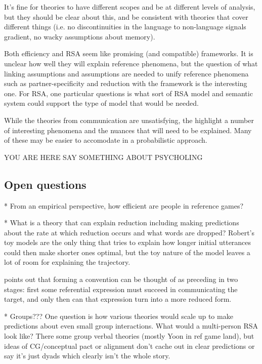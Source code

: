 \documentclass[]{article}
\begin{document}
It's fine for theories to have different scopes and be at different levels of analysis, but they should be clear about this, and be consistent with theories that cover different things (i.e. no discontinuities in the language to non-language signals gradient, no wacky assumptions about memory).

Both efficiency and RSA seem like promising (and compatible) frameworks. It is unclear how well they will explain reference phenomena, but the question of what linking assumptions and assumptions are needed to unify reference phenomena such as partner-specificity and reduction with the framework is the interesting one. For RSA, one particular questions is what sort of RSA model and semantic system could support the type of model that would be needed. 

While the theories from communication are unsatisfying, the highlight a number of interesting phenomena and the nuances that will need to be explained. Many of these may be easier to accomodate in a probabilistic approach. 

YOU ARE HERE SAY SOMETHING ABOUT PSYCHOLING

\subsection{Open questions}
* From an empirical perspective, how efficient are people in reference games? 

* What is a theory that can explain reduction including making predictions about the rate at which reduction occurs and what words are dropped? Robert's toy models are the only thing that tries to explain how longer initial utterances could then make shorter ones optimal, but the toy nature of the model leaves a lot of room for explaining the trajectory. 

\cite{leung2023} points out that forming a convention can be thought of as preceding in two stages: first some referential expression must succeed in communicating the target, and only then can that expression turn into a more reduced form.


* Groups??? One question is how various theories would scale up to make predictions about even small group interactions. What would a multi-person RSA look like? There some group verbal theories (mostly Yoon in ref game land), but ideas of CG/conceptual pact or alignment don't cache out in clear predictions or say it's just dyads which clearly isn't the whole story. 
\end{document}
